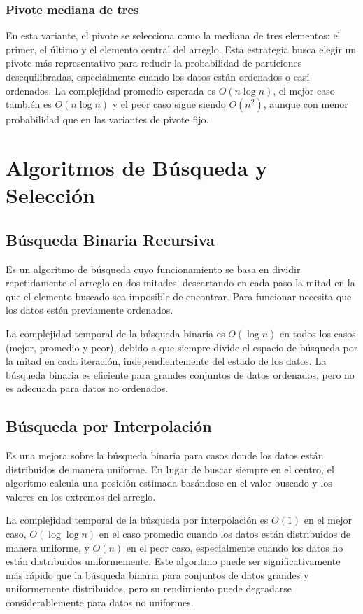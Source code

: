 \subsubsection{Pivote mediana de tres}
En esta variante, el pivote se selecciona como la mediana de tres elementos: el primer, el último y el elemento central del arreglo. Esta estrategia busca elegir un pivote más representativo para reducir la probabilidad de particiones desequilibradas, especialmente cuando los datos están ordenados o casi ordenados. La complejidad promedio esperada es \(O(n \log n)\), el mejor caso también es \(O(n \log n)\) y el peor caso sigue siendo \(O(n^2)\), aunque con menor probabilidad que en las variantes de pivote fijo.

\section{Algoritmos de Búsqueda y Selección}

\subsection{Búsqueda Binaria Recursiva}
Es un algoritmo de búsqueda cuyo funcionamiento se basa en dividir repetidamente el arreglo en dos mitades, descartando en cada paso la mitad en la que el elemento buscado sea imposible de encontrar. Para funcionar necesita que los datos estén previamente ordenados.

La complejidad temporal de la búsqueda binaria es \(O(\log n)\) en todos los casos (mejor, promedio y peor), debido a que siempre divide el espacio de búsqueda por la mitad en cada iteración, independientemente del estado de los datos. La búsqueda binaria es eficiente para grandes conjuntos de datos ordenados, pero no es adecuada para datos no ordenados.

\subsection{Búsqueda por Interpolación}
Es una mejora sobre la búsqueda binaria para casos donde los datos están distribuidos de manera uniforme. En lugar de buscar siempre en el centro, el algoritmo calcula una posición estimada basándose en el valor buscado y los valores en los extremos del arreglo.

La complejidad temporal de la búsqueda por interpolación es \(O(1)\) en el mejor caso, \(O(\log \log n)\) en el caso promedio cuando los datos están distribuidos de manera uniforme, y \(O(n)\) en el peor caso, especialmente cuando los datos no están distribuidos uniformemente. Este algoritmo puede ser significativamente más rápido que la búsqueda binaria para conjuntos de datos grandes y uniformemente distribuidos, pero su rendimiento puede degradarse considerablemente para datos no uniformes.


